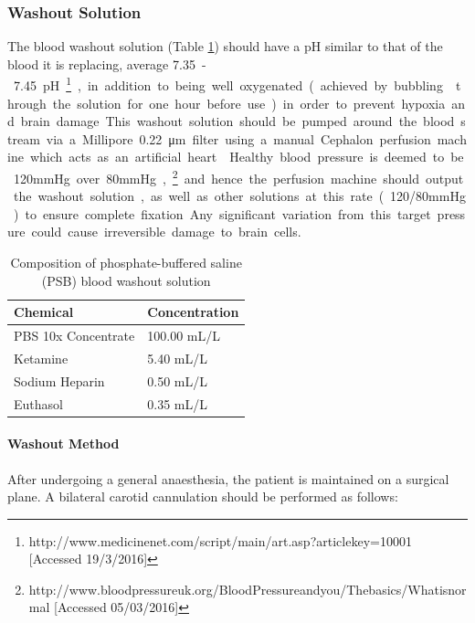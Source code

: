 \documentclass[a4paper, 11pt]{article}
\numberwithin{equation}{section}
\begin{document}
\subsubsection{Washout Solution}

The blood washout solution (Table \ref{washoutsolution}) should have a pH similar to that of the blood it is replacing, average \SI{7.35} - \SI{7.45}{pH}\footnote{http://www.medicinenet.com/script/main/art.asp?articlekey=10001 [Accessed 19/3/2016]}, in addition to being well oxygenated (achieved by bubbling  through the solution for one hour before use) in order to prevent hypoxia and brain damage. This washout solution should be pumped around the blood stream via a Millipore \SI{0.22}{\micro\meter} filter using a manual Cephalon perfusion machine which acts as an artificial heart \cite{pulsatilemachineperfusion}. Healthy blood pressure is deemed to be 120mmHg over 80mmHg,\footnote{http://www.bloodpressureuk.org/BloodPressureandyou/Thebasics/Whatisnormal [Accessed 05/03/2016]} and hence the perfusion machine should output the washout solution, as well as other solutions at this rate (120/80mmHg) to ensure complete fixation. Any significant variation from this target pressure could cause irreversible damage to brain cells.

\begin{table}[H]
\centering

\begin{tabular}{|l|l|}
\hline
\textbf{Chemical} & \textbf{Concentration} \\ \hline
PBS 10x Concentrate & 100.00 mL/L \\ \hline
Ketamine & 5.40 mL/L \\ \hline
Sodium Heparin & 0.50 mL/L \\ \hline
Euthasol & 0.35 mL/L \\ \hline
\end{tabular}
\caption{Composition of phosphate-buffered saline (PSB) blood washout solution \cite{Aldehyde_stabilized_cryopreservation}}
\label{washoutsolution}
\end{table}

\paragraph{Washout Method}

After undergoing a general anaesthesia, the patient is maintained on a surgical plane. A bilateral carotid cannulation should be performed as follows:
\end{document}
